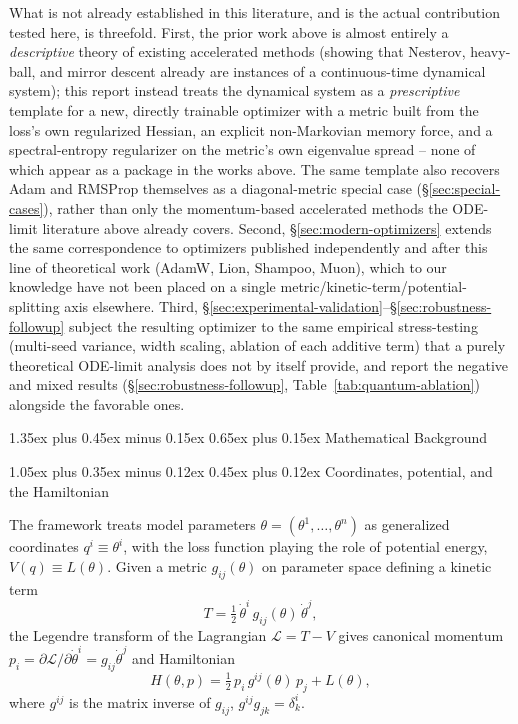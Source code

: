 \documentclass[10pt,twocolumn]{article}
\makeatletter
\renewcommand\section{\@startsection{section}{1}{0pt}%
  {1.35ex plus 0.45ex minus 0.15ex}%
  {0.65ex plus 0.15ex}%
  {\large\bfseries}}
\renewcommand\subsection{\@startsection{subsection}{2}{0pt}%
  {1.05ex plus 0.35ex minus 0.12ex}%
  {0.45ex plus 0.12ex}%
  {\normalsize\bfseries}}
\makeatother
\begin{document}
What is not already established in this literature, and is the actual
contribution tested here, is threefold. First, the prior work above is
almost entirely a \emph{descriptive} theory of existing accelerated methods
(showing that Nesterov, heavy-ball, and mirror descent already are
instances of a continuous-time dynamical system); this report instead
treats the dynamical system as a \emph{prescriptive} template for a new,
directly trainable optimizer with a metric built from the loss's own
regularized Hessian, an explicit non-Markovian memory force, and a
spectral-entropy regularizer on the metric's own eigenvalue spread --
none of which appear as a package in the works above. The same template
also recovers Adam and RMSProp themselves as a diagonal-metric special case
(\S\ref{sec:special-cases}), rather than only the momentum-based accelerated
methods the ODE-limit literature above already covers. Second,
\S\ref{sec:modern-optimizers} extends the same correspondence to
optimizers published independently and after this line of theoretical
work (AdamW, Lion, Shampoo, Muon), which to our knowledge have not been
placed on a single metric/kinetic-term/potential-splitting axis elsewhere.
Third, \S\ref{sec:experimental-validation}--\S\ref{sec:robustness-followup}
subject the resulting optimizer to the same empirical stress-testing
(multi-seed variance, width scaling, ablation of each additive term) that a
purely theoretical ODE-limit analysis does not by itself provide, and report
the negative and mixed results (\S\ref{sec:robustness-followup},
Table~\ref{tab:quantum-ablation}) alongside the favorable ones.

\section{Mathematical Background}
\label{sec:mathematical-background}

\subsection{Coordinates, potential, and the Hamiltonian}

The framework treats model parameters $\theta = (\theta^1,\dots,\theta^n)$ as
generalized coordinates $q^i \equiv \theta^i$, with the loss function playing
the role of potential energy, $V(q) \equiv L(\theta)$. Given a metric
$g_{ij}(\theta)$ on parameter space defining a kinetic term
\begin{equation}
T = \tfrac{1}{2}\,\dot\theta^i\, g_{ij}(\theta)\, \dot\theta^j,
\end{equation}
the Legendre transform of the Lagrangian $\mathcal L = T - V$ gives canonical
momentum $p_i = \partial \mathcal L/\partial \dot\theta^i = g_{ij}\dot\theta^j$
and Hamiltonian
\begin{equation}
H(\theta,p) = \tfrac{1}{2}\, p_i\, g^{ij}(\theta)\, p_j + L(\theta),
\label{eq:hamiltonian}
\end{equation}
where $g^{ij}$ is the matrix inverse of $g_{ij}$, $g^{ij}g_{jk} = \delta^i_k$.
\end{document}

